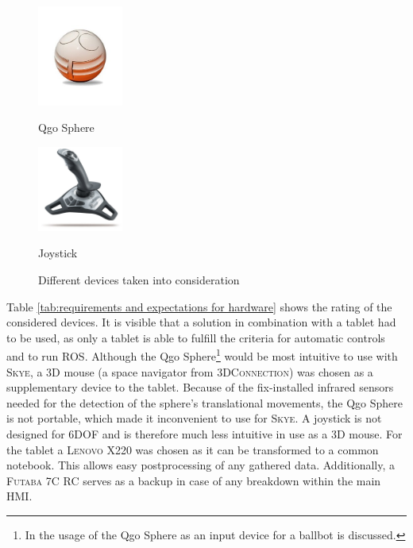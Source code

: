 \begin{figure}[h]
{\begin{center}
			\vspace{0.005\textwidth}
			\hspace{0.05\textwidth}			
			\parbox[b]{0.25\textwidth}{\includegraphics[width=0.25\textwidth]{qgo_sphere_cut}
			\begin{center}Qgo Sphere \end{center}}
			\hspace{0.05\textwidth}
			\parbox[b]{0.25\textwidth}{\includegraphics[width=0.25\textwidth]{Logitech-Freedom-Cordless-Joystick}
			\begin{center}Joystick \end{center}}
			\caption[Different devices taken into consideration]{Different devices taken into consideration}
			\label{fig:devices taken into consideration}	
		\end{center}
	}			
	\vspace{4.5mm}
\end{figure}

Table \ref{tab:requirements and expectations for hardware} shows the rating of the considered devices. It is visible that a solution in combination with a tablet had to be used, as only a tablet is able to fulfill the criteria for automatic controls and to run \textsc{ROS}. Although the Qgo Sphere\footnote{In  \cite{kammermann} the usage of the Qgo Sphere as an input device for a ballbot is discussed.} would be most intuitive to use with \textsc{Skye}, a 3D mouse (a space navigator from \textsc{3DConnection}) was chosen as a supplementary device to the tablet. Because of the fix-installed infrared sensors needed for the detection of the sphere's translational movements, the Qgo Sphere is not portable, which made it inconvenient to use for \textsc{Skye}. A joystick is not designed for 6DOF and is therefore much less intuitive in use as a 3D mouse. For the tablet a \textsc{Lenovo} X220 was chosen as it can be transformed to a common notebook. This allows easy postprocessing of any gathered data. Additionally, a \textsc{Futaba} 7C RC serves as a backup in case of any breakdown within the main HMI.


